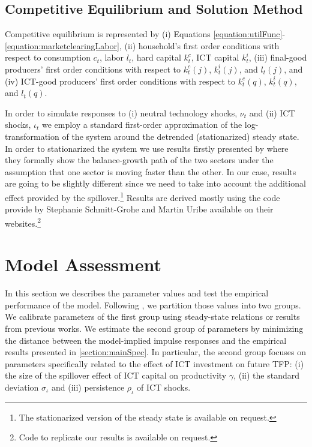 \documentclass[12pt]{article}
\begin{document}
\subsection{Competitive Equilibrium and Solution Method}

Competitive equilibrium is represented by (i) Equations \ref{equation:utilFunc}-\ref{equation:marketclearingLabor}, (ii) household's first order conditions with respect to consumption $c_t$, labor $l_t$, hard capital $k^c_t$, ICT capital $k^i_t$, (iii) final-good producers' first order conditions with respect to $k^c_{t}(j)$, $k^i_{t}(j)$, and $l_{t}(j)$, and (iv) ICT-good producers' first order conditions with respect to $k^c_{t}(q)$, $k^i_{t}(q)$, and $l_{t}(q)$. 

In order to simulate responses to (i) neutral technology shocks, $\nu_t$ and (ii) ICT shocks, $\iota_t$ we employ a standard first-order approximation of the log-transformation of the system around the detrended (stationarized) steady state. In order to stationarized the system we use results firstly presented by \cite{greenwood1997long} where they formally show the balance-growth path of the two sectors under the assumption that one sector is moving faster than the other. In our case, results are going to be slightly different since we need to take into account the additional effect provided by the spillover.\footnote{The stationarized version of the steady state is available on request.} Results are derived mostly using the code provide by Stephanie Schmitt-Grohe and Martin Uribe available on their websites.\footnote{Code to replicate our results is available on request.}

\section{Model Assessment}

In this section we describes the parameter values and test the empirical performance of the model. Following \cite{christiano2005nominal}, we partition those values into two groups. We calibrate parameters of the first group using steady-state relations or results from previous works. We estimate the second group of parameters by minimizing the distance between the model-implied impulse responses and the empirical results presented in \ref{section:mainSpec}. In particular, the second group focuses on parameters specifically related to the effect of ICT investment on future TFP: (i) the size of the spillover effect of ICT capital on productivity $\gamma$, (ii) the standard deviation $\sigma_{\iota}$ and (iii) persistence $\rho_{\iota}$ of ICT shocks. 
\end{document}
